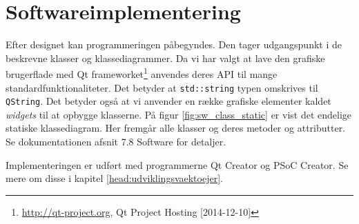 \section{Softwareimplementering}
Efter designet kan programmeringen påbegyndes. Den tager udgangspunkt i de beskrevne klasser og klassediagrammer.
Da vi har valgt at lave den grafiske brugerflade med Qt frameworket\footnote{\url{http://qt-project.org}, Qt Project Hosting [2014-12-10]} anvendes deres API til mange standardfunktionaliteter. Det betyder at \verb+std::string+ typen omskrives til \verb+QString+. 
Det betyder også at vi anvender en række grafiske elementer kaldet \textit{widgets} til at opbygge klasserne. På figur \ref{fig:sw_class_static} er vist det endelige statiske klassediagram. Her fremgår alle klasser og deres metoder og attributter.
Se dokumentationen afsnit 7.8 Software for detaljer.


Implementeringen er udført med programmerne Qt Creator og PSoC Creator. Se mere om disse i kapitel \ref{head:udviklingsvaektoejer}.


